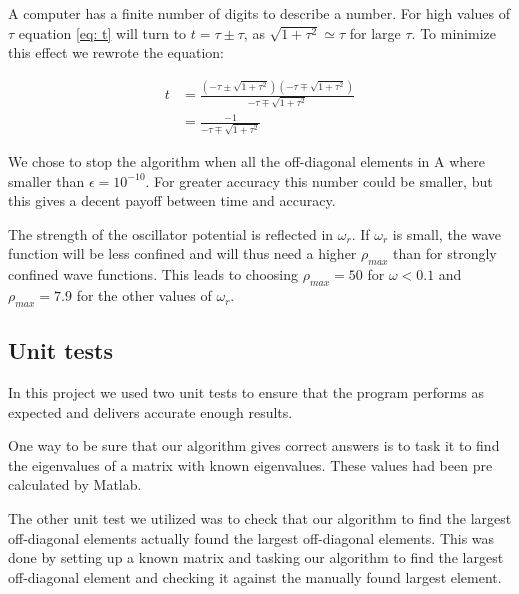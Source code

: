 A computer has a finite number of digits to describe a number. For high values of $ \tau $  equation \ref{eq: t} will turn to $ t = \tau \pm \tau $, as $ \sqrt{1+\tau^2} \simeq \tau $ for large $ \tau $. To minimize this effect we rewrote the equation: 

\begin{align}
t &= \frac{(-\tau \pm \sqrt{1+\tau^2})(-\tau \mp \sqrt{1+ \tau^2})}{-\tau \mp \sqrt{1+\tau^2}}\\
&= \frac{-1}{-\tau \mp \sqrt{1+\tau^2}}
\end{align}


We chose to stop the algorithm when all the off-diagonal elements in A where smaller than $ \epsilon = 10^{-10} $.  For greater accuracy this number could be smaller, but this gives a decent payoff between time and accuracy. 

The strength of the oscillator potential is reflected in $ \omega_r $. If $ \omega_r $ is small, the wave function will be less confined and will thus need a higher $ \rho_{max} $ than for strongly confined wave functions. This leads to choosing  $   \rho_{max} = 50 $ for $  \omega<0.1 $ and $ \rho_{max} = 7.9 $ for the other values of $ \omega_r $. 


\subsection{Unit tests}

In this project we used two unit tests to ensure that the program performs as expected and delivers accurate enough results. 

One way to be sure that our algorithm gives correct answers is to task it to find the eigenvalues of a matrix with known eigenvalues. These values had been pre calculated by Matlab. 

The other unit test we utilized was to check that our algorithm to find the largest off-diagonal elements actually found the largest off-diagonal elements. This was done by setting up a known matrix and tasking our algorithm to find the largest off-diagonal element and checking it against the manually found largest element. 





